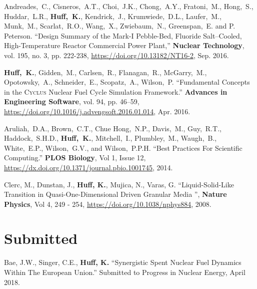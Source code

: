\documentclass[margin,line]{resume}
\newcommand{\Cyclus}{\textsc{Cyclus}\xspace}%
\begin{document}
\begin{resume}
\begin{bibenum}
      \item Andreades,~C., Cisneros,~A.T., Choi,~J.K., Chong,~A.Y., 
              Fratoni,~M., Hong,~S., Huddar,~L.R., \textbf{Huff,~K.}, Kendrick,~J., 
              Krumwiede,~D.L., Laufer,~M., Munk,~M., Scarlat,~R.O., Wang,~X., 
              Zwiebaum,~N., Greenspan,~E. and P. Peterson.  ``Design Summary of 
              the Mark-I Pebble-Bed, Fluoride Salt–Cooled, High-Temperature 
              Reactor Commercial Power Plant,'' \textbf{Nuclear Technology}, 
              vol. 195, no. 3, pp. 222-238,
              \url{https://doi.org/10.13182/NT16-2},
              Sep. 2016.
       \item \textbf{Huff,~K.}, Gidden,~M., Carlsen,~R., Flanagan,~R., 
               McGarry,~M., Opotowsky,~A., Schneider,~E., Scopatz,~A., 
               Wilson,~P.  ``Fundamental Concepts in the \Cyclus Nuclear Fuel 
               Cycle Simulation Framework.'' \textbf{Advances in Engineering 
               Software}, vol. 94, pp. 46–59, 
               \url{https://doi.org/10.1016/j.advengsoft.2016.01.014},
               Apr. 2016.
       \item Aruliah,~D.A., Brown,~C.T., Chue Hong,~N.P., Davis,~M., Guy,~R.T., 
               Haddock,~S.H.D., \textbf{Huff,~K.}, Mitchell,~I., Plumbley,~M., 
               Waugh,~B., White,~E.P., Wilson,~G.V., and Wilson,~P.P.H.  ``Best 
               Practices For Scientific Computing.'' \textbf{PLOS Biology}, Vol 
               1, Issue 12, \url{https://dx.doi.org/10.1371/journal.pbio.1001745}, 
               2014. 
       \item Clerc, M., Dunstan, J., \textbf{Huff, K.}, Mujica, N., Varas, G.  
               ``Liquid-Solid-Like Transition in Quasi-One-Dimensional Driven 
               Granular Media '',  \textbf{Nature Physics}, Vol 4, 249 - 254, 
               \url{https://doi.org/10.1038/nphys884}, 2008.
      \end{bibenum}
      \vspace{2mm} %
      \section{\mysidestyle Submitted}
      \begin{bibenum}
      \item Bae, J.W., Singer, C.E., \textbf{Huff, K.} ``Synergistic Spent 
              Nuclear Fuel Dynamics Within The European Union.'' Submitted to 
              Progress in Nuclear Energy, April 2018.
      \end{bibenum}

\end{resume}
\end{document}
